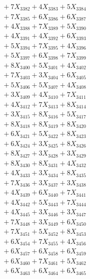 \documentclass[a4paper,10pt]{article}
\begin{document}
{\begin{align}
&\;  + 7 X_{3382} + 4 X_{3383} + 5 X_{3384} \\[0.3ex]
&\;  + 7 X_{3385} + 6 X_{3386} + 6 X_{3387} \\[0.3ex]
&\;  + 4 X_{3388} + 7 X_{3389} + 5 X_{3390} \\[0.3ex]
&\;  + 4 X_{3391} + 4 X_{3392} + 6 X_{3393} \\[0.3ex]
&\;  + 5 X_{3394} + 7 X_{3395} + 4 X_{3396} \\[0.3ex]
&\;  + 5 X_{3397} + 6 X_{3398} + 7 X_{3399} \\[0.5ex]\allowbreak
&\;  + 8 X_{3400} + 5 X_{3401} + 4 X_{3402} \\[0.3ex]
&\;  + 7 X_{3403} + 3 X_{3404} + 6 X_{3405} \\[0.3ex]
&\;  + 5 X_{3406} + 5 X_{3407} + 4 X_{3408} \\[0.3ex]
&\;  + 3 X_{3409} + 4 X_{3410} + 7 X_{3411} \\[0.3ex]
&\;  + 4 X_{3412} + 7 X_{3413} + 8 X_{3414} \\[0.3ex]
&\;  + 3 X_{3415} + 8 X_{3416} + 5 X_{3417} \\[0.3ex]
&\;  + 8 X_{3418} + 8 X_{3419} + 8 X_{3420} \\[0.3ex]
&\;  + 6 X_{3421} + 5 X_{3422} + 8 X_{3423} \\[0.3ex]
&\;  + 6 X_{3424} + 3 X_{3425} + 8 X_{3426} \\[0.3ex]
&\;  + 8 X_{3427} + 3 X_{3428} + 3 X_{3429} \\[0.5ex]\allowbreak
&\;  + 8 X_{3430} + 8 X_{3431} + 4 X_{3432} \\[0.3ex]
&\;  + 4 X_{3433} + 3 X_{3434} + 8 X_{3435} \\[0.3ex]
&\;  + 7 X_{3436} + 3 X_{3437} + 3 X_{3438} \\[0.3ex]
&\;  + 4 X_{3439} + 6 X_{3440} + 7 X_{3441} \\[0.3ex]
&\;  + 4 X_{3442} + 5 X_{3443} + 7 X_{3444} \\[0.3ex]
&\;  + 4 X_{3445} + 3 X_{3446} + 3 X_{3447} \\[0.3ex]
&\;  + 7 X_{3448} + 3 X_{3449} + 6 X_{3450} \\[0.3ex]
&\;  + 7 X_{3451} + 5 X_{3452} + 8 X_{3453} \\[0.3ex]
&\;  + 6 X_{3454} + 7 X_{3455} + 4 X_{3456} \\[0.3ex]
&\;  + 6 X_{3457} + 6 X_{3458} + 6 X_{3459} \\[0.5ex]\allowbreak
&\;  + 6 X_{3460} + 7 X_{3461} + 5 X_{3462} \\[0.3ex]
&\;  + 6 X_{3463} + 6 X_{3464} + 6 X_{3465} \\[0.3ex]

\end{align}}
\end{document}
